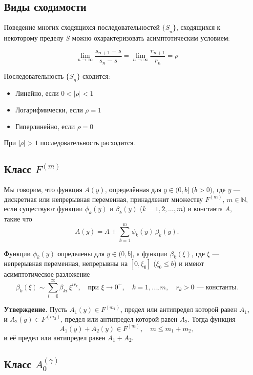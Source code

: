 \documentclass[14pt, a4paper]{extarticle}
\theoremstyle{definition}
\theoremstyle{remark}
\begin{document}
\subsection*{Виды сходимости}

Поведение многих сходящихся последовательностей \({\{ S}_{n}\}\),
сходящихся к некоторому пределу \(S\) можно охарактеризовать
асимптотическим условием:

\[\lim_{n \rightarrow \infty}\frac{s_{n + 1} - s}{s_{n} - s} = \lim_{n \rightarrow \infty}\frac{r_{n + 1}}{r_{n}} = \rho\]

Последовательность \({\{ S}_{n}\}\) сходится:

\begin{itemize}
\item
  Линейно, если \(0 < |\rho| < 1\)
\item
  Логарифмически, если \(\rho = 1\)
\item
  Гиперлинейно, если \(\rho = 0\)
\end{itemize}

При \(|\rho| > 1\) последовательность расходится.

\subsection*{Класс \(F^{(m)}\)}

Мы говорим, что функция \(A(y)\), определённая для \(y \in (0,b]\) (\(b>0\)), где \(y\) — дискретная или непрерывная переменная, принадлежит множеству \(F^{(m)}\), \(m \in \mathbb{N}\), если существуют функции \(\phi_k(y)\) и \(\beta_k(y)\) (\(k=1,2,\dots,m\)) и константа \(A\), такие что
\[
A(y) = A + \sum_{k=1}^{m} \phi_k(y)\, \beta_k(y).
\]

Функции \(\phi_k(y)\) определены для \(y \in (0,b]\), а функции \(\beta_k(\xi)\), где \(\xi\) — непрерывная переменная, непрерывны на \([0,\xi_0]\) (\(\xi_0 \le b\)) и имеют асимптотическое разложение
\[
\beta_k(\xi) \sim \sum_{i=0}^{\infty} \beta_{ki}\, \xi^{i r_k}, \quad \text{при } \xi \to 0^+, \quad k=1,\dots,m, \quad r_k>0 \text{ — константы.}
\]

\textbf{Утверждение.} Пусть \(A_1(y) \in F^{(m_1)}\), предел или антипредел которой равен \(A_1\), и \(A_2(y) \in F^{(m_2)}\), предел или антипредел которой равен \(A_2\). Тогда функция
\[
A_1(y) + A_2(y) \in F^{(m)}, \quad m \le m_1 + m_2,
\]
и её предел или антипредел равен \(A_1 + A_2\).

\subsection*{Класс \(A_{0}^{(\gamma)}\)}
\end{document}
